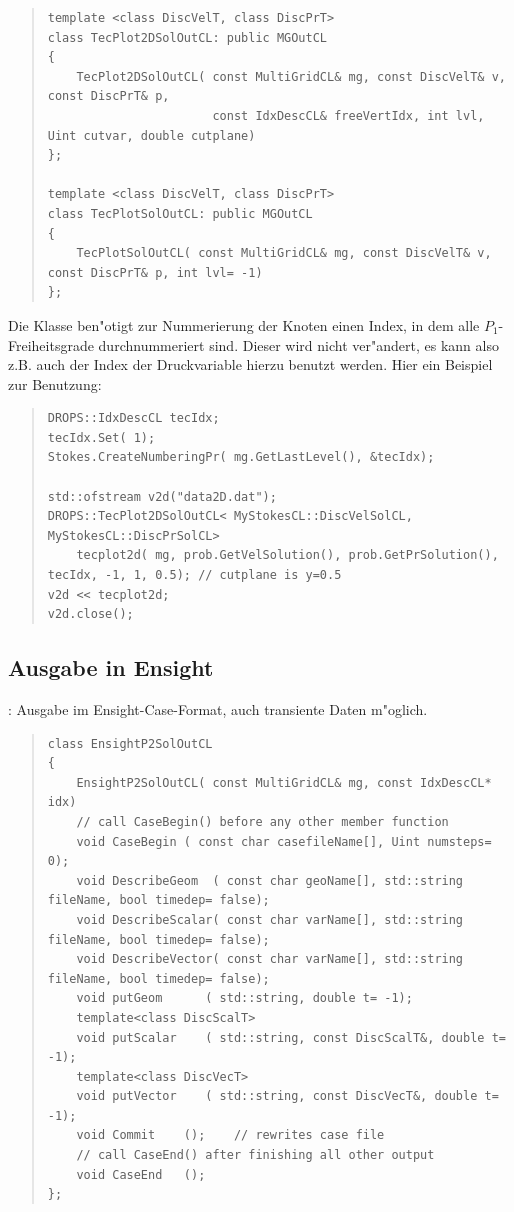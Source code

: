 \documentclass[11pt,a4paper]{article}
\newenvironment{Code}{\begin{quote}\scriptsize}{\end{quote}}
\begin{document}
\begin{Code}
\begin{verbatim}
template <class DiscVelT, class DiscPrT>
class TecPlot2DSolOutCL: public MGOutCL
{
    TecPlot2DSolOutCL( const MultiGridCL& mg, const DiscVelT& v, const DiscPrT& p, 
                       const IdxDescCL& freeVertIdx, int lvl, Uint cutvar, double cutplane)
};

template <class DiscVelT, class DiscPrT>
class TecPlotSolOutCL: public MGOutCL
{
    TecPlotSolOutCL( const MultiGridCL& mg, const DiscVelT& v, const DiscPrT& p, int lvl= -1)
};
\end{verbatim}
\end{Code}
Die Klasse  ben"otigt zur Nummerierung der Knoten einen 
Index, in dem alle $P_1$-Freiheitsgrade durchnummeriert sind. Dieser wird nicht
ver"andert, es kann also z.B. auch der Index der Druckvariable hierzu benutzt
werden. Hier ein Beispiel zur Benutzung:
\begin{Code}
\begin{verbatim}
DROPS::IdxDescCL tecIdx;
tecIdx.Set( 1);
Stokes.CreateNumberingPr( mg.GetLastLevel(), &tecIdx);    

std::ofstream v2d("data2D.dat");
DROPS::TecPlot2DSolOutCL< MyStokesCL::DiscVelSolCL, MyStokesCL::DiscPrSolCL>
    tecplot2d( mg, prob.GetVelSolution(), prob.GetPrSolution(), tecIdx, -1, 1, 0.5); // cutplane is y=0.5
v2d << tecplot2d;
v2d.close();
\end{verbatim}
\end{Code}

\subsection{Ausgabe in Ensight}
: Ausgabe im Ensight-Case-Format, auch transiente Daten
m"oglich.
\begin{Code}
\begin{verbatim}
class EnsightP2SolOutCL
{
    EnsightP2SolOutCL( const MultiGridCL& mg, const IdxDescCL* idx)
    // call CaseBegin() before any other member function
    void CaseBegin ( const char casefileName[], Uint numsteps= 0);
    void DescribeGeom  ( const char geoName[], std::string fileName, bool timedep= false);
    void DescribeScalar( const char varName[], std::string fileName, bool timedep= false);
    void DescribeVector( const char varName[], std::string fileName, bool timedep= false);
    void putGeom      ( std::string, double t= -1);
    template<class DiscScalT>
    void putScalar    ( std::string, const DiscScalT&, double t= -1);
    template<class DiscVecT>
    void putVector    ( std::string, const DiscVecT&, double t= -1);
    void Commit    ();    // rewrites case file
    // call CaseEnd() after finishing all other output
    void CaseEnd   ();
};
\end{verbatim}
\end{Code}
\end{document}
